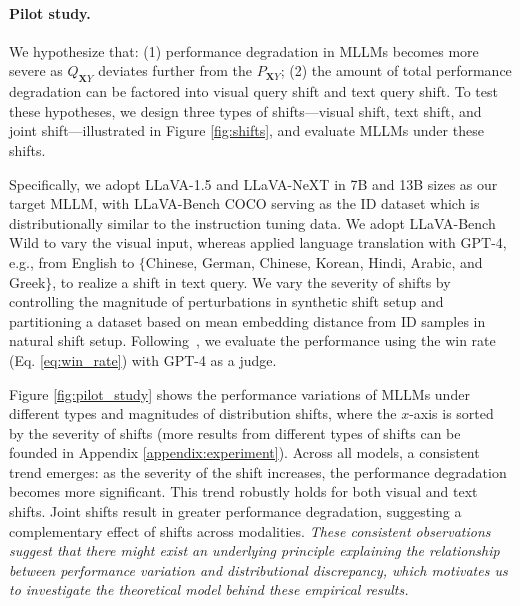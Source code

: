\paragraph{Pilot study.} 
We hypothesize that: (1) performance degradation in MLLMs becomes more severe as $Q_{\mathbf{X}Y}$ deviates further from the $P_{\mathbf{X}Y}$; (2) the amount of total performance degradation can be factored into visual query shift and text query shift. To test these hypotheses, we design three types of shifts---visual shift, text shift, and joint shift---illustrated in Figure \ref{fig:shifts}, and evaluate MLLMs under these shifts. 

Specifically, we adopt LLaVA-1.5 \cite{liu2023visual} and LLaVA-NeXT \cite{liu2024improved} in 7B and 13B sizes as our target MLLM, with LLaVA-Bench COCO \cite{liu2023visual} serving as the ID dataset which is distributionally similar to the instruction tuning data. 
We adopt LLaVA-Bench Wild \citet{liu2023visual} to vary the visual input, whereas applied language translation with GPT-4, e.g., from English to $\{$Chinese, German, Chinese, Korean, Hindi, Arabic, and Greek$\}$, to realize a shift in text query. We vary the severity of shifts by controlling the magnitude of perturbations in synthetic shift setup and partitioning a dataset based on mean embedding distance from ID samples in natural shift setup. Following~\cite{liu2023visual}, we evaluate the performance using the win rate (Eq. \eqref{eq:win_rate}) with GPT-4 as a judge.

Figure \ref{fig:pilot_study} shows the performance variations of MLLMs under different types and magnitudes of distribution shifts, where the $x$-axis is sorted by the severity of shifts (more results from different types of shifts can be founded in Appendix \ref{appendix:experiment}).
Across all models, a consistent trend emerges: as the severity of the shift increases, the performance degradation becomes more significant. This trend robustly holds for both visual and text shifts. Joint shifts result in greater performance degradation, suggesting a complementary effect of shifts across modalities.  {\textit{These consistent observations suggest that there might exist an underlying principle explaining the relationship between performance variation and distributional discrepancy, which motivates us to investigate the theoretical model behind these empirical results.}}

\vspace{-0.2cm}
